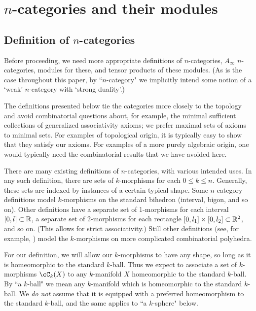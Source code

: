 
\def\xxpar#1#2{\smallskip\noindent{\bf #1} {\it #2} \smallskip}
\def\mmpar#1#2#3{\smallskip\noindent{\bf #1} (#2). {\it #3} \smallskip}

\section{$n$-categories and their modules}
\label{sec:ncats}

\subsection{Definition of $n$-categories}
\label{ss:n-cat-def}

Before proceeding, we need more appropriate definitions of $n$-categories, 
$A_\infty$ $n$-categories, modules for these, and tensor products of these modules.
(As is the case throughout this paper, by ``$n$-category" we implicitly intend some notion of
a `weak' $n$-category with `strong duality'.)

The definitions presented below tie the categories more closely to the topology
and avoid combinatorial questions about, for example, the minimal sufficient
collections of generalized associativity axioms; we prefer maximal sets of axioms to minimal sets.
For examples of topological origin, it is typically easy to show that they
satisfy our axioms.
For examples of a more purely algebraic origin, one would typically need the combinatorial
results that we have avoided here.

\medskip

There are many existing definitions of $n$-categories, with various intended uses.
In any such definition, there are sets of $k$-morphisms for each $0 \leq k \leq n$.
Generally, these sets are indexed by instances of a certain typical shape. 
Some $n$-category definitions model $k$-morphisms on the standard bihedron (interval, bigon, and so on).
Other definitions have a separate set of 1-morphisms for each interval $[0,l] \subset \mathbb{R}$, 
a separate set of 2-morphisms for each rectangle $[0,l_1]\times [0,l_2] \subset \mathbb{R}^2$,
and so on.
(This allows for strict associativity.)
Still other definitions (see, for example, \cite{MR2094071})
model the $k$-morphisms on more complicated combinatorial polyhedra.

For our definition, we will allow our $k$-morphisms to have any shape, so long as it is homeomorphic to the standard $k$-ball.
Thus we expect to associate a set of $k$-morphisms $\cC_k(X)$ to any $k$-manifold $X$ homeomorphic 
to the standard $k$-ball.
By ``a $k$-ball" we mean any $k$-manifold which is homeomorphic to the 
standard $k$-ball.
We {\it do not} assume that it is equipped with a 
preferred homeomorphism to the standard $k$-ball, and the same applies to ``a $k$-sphere" below.

